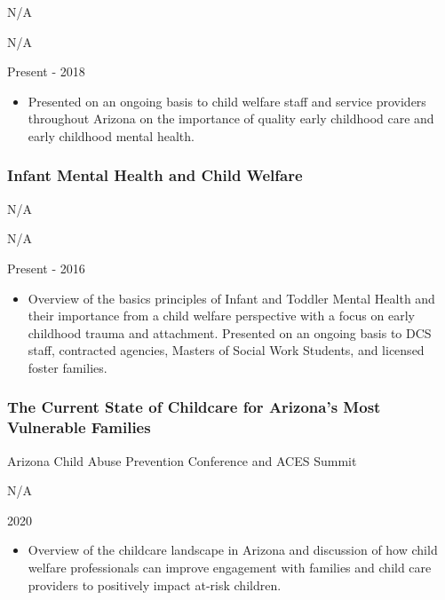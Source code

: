\documentclass[
]{article}
\providecommand{\tightlist}{%
  \setlength{\itemsep}{0pt}\setlength{\parskip}{0pt}}
\begin{document}
N/A

N/A

Present - 2018

\begin{itemize}
\tightlist
\item
  Presented on an ongoing basis to child welfare staff and service
  providers throughout Arizona on the importance of quality early
  childhood care and early childhood mental health.
\end{itemize}

\hypertarget{infant-mental-health-and-child-welfare}{%
\subsubsection{Infant Mental Health and Child
Welfare}\label{infant-mental-health-and-child-welfare}}

N/A

N/A

Present - 2016

\begin{itemize}
\tightlist
\item
  Overview of the basics principles of Infant and Toddler Mental Health
  and their importance from a child welfare perspective with a focus on
  early childhood trauma and attachment. Presented on an ongoing basis
  to DCS staff, contracted agencies, Masters of Social Work Students,
  and licensed foster families.
\end{itemize}

\hypertarget{the-current-state-of-childcare-for-arizonas-most-vulnerable-families}{%
\subsubsection{The Current State of Childcare for Arizona's Most
Vulnerable
Families}\label{the-current-state-of-childcare-for-arizonas-most-vulnerable-families}}

Arizona Child Abuse Prevention Conference and ACES Summit

N/A

2020

\begin{itemize}
\tightlist
\item
  Overview of the childcare landscape in Arizona and discussion of how
  child welfare professionals can improve engagement with families and
  child care providers to positively impact at-risk children.
\end{itemize}
\end{document}
